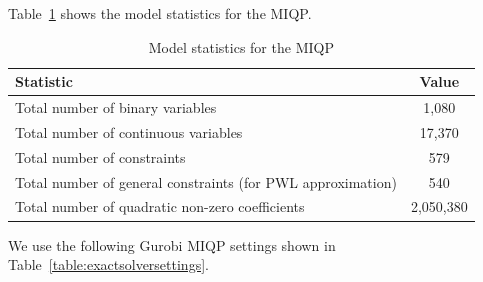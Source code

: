 \documentclass[preprint,times]{elsarticle}
\begin{document}

Table~\ref{table:modelstats} shows the model statistics for the \ac{MIQP}.
%
\begin{table}[H]
\centering
\caption{Model statistics for the \ac{MIQP}}
\begin{tabular}{|l|c|}
\hline
\textbf{Statistic} & \textbf{Value}\\
\hline
Total number of binary variables & 1,080 \\
Total number of continuous variables & 17,370 \\
Total number of constraints & 579 \\
Total number of general constraints (for \ac{PWL} approximation) & 540 \\
Total number of quadratic non-zero coefficients & 2,050,380 \\
\hline
\end{tabular}
\label{table:modelstats}
\end{table}
%
%
We use the following Gurobi \ac{MIQP} settings shown in Table~\ref{table:exactsolversettings}.
\end{document}
